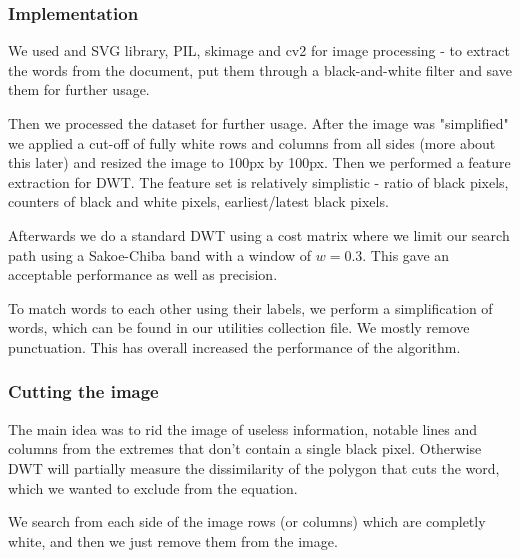 \documentclass[12pt]{article}
\begin{document}
\subsubsection*{Implementation}

We used and SVG library, PIL, skimage and cv2 for image processing - to extract the words from the document, put them through a black-and-white filter and save them for further usage.

Then we processed the dataset for further usage. After the image was "simplified" we applied a cut-off of fully white rows and columns from all sides (more about this later) and resized the image to 100px by 100px. Then we performed a feature extraction for DWT. The feature set is relatively simplistic - ratio of black pixels, counters of black and white pixels, earliest/latest black pixels.

Afterwards we do a standard DWT using a cost matrix where we limit our search path using a Sakoe-Chiba band with a window of $w = 0.3$. This gave an acceptable performance as well as precision.

To match words to each other using their labels, we perform a simplification of words, which can be found in our utilities collection file. We mostly remove punctuation. This has overall increased the performance of the algorithm.

\subsubsection*{Cutting the image}

The main idea was to rid the image of useless information, notable lines and columns from the extremes that don't contain a single black pixel. Otherwise DWT will partially measure the dissimilarity of the polygon that cuts the word, which we wanted to exclude from the equation.

We search from each side of the image rows (or columns) which are completly white, and then we just remove them from the image.
\end{document}
